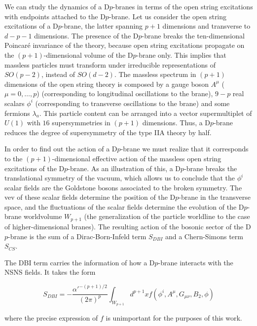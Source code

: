 We can study the dynamics of a D$p$-branes in terms of the open string excitations  with endpoints
attached to the D$p$-brane.
Let us consider the open string excitations of a D$p$-brane, the latter spanning $p+1$ dimensions and transverse to $d-p-1$ dimensions.
The presence of the D$p$-brane breaks the ten-dimensional Poincaré invariance of the theory, because
open string excitations propagate on the $(p+1)$-dimensional volume of the D$p$-brane only.
This implies that massless particles must transform under irreducible representations of $SO(p-2)$, instead of
$SO(d-2)$.
The massless spectrum in $(p+1)$ dimensions of the open string theory is composed by a gauge boson $A^\mu$ ($\mu=0,\ldots,p$) (corresponding
to longitudinal oscillations to the brane),
$9-p$ real scalars $\phi^i$ (corresponding to transverse oscillations to the brane) and some fermions $\lambda_a$.
This particle content can be arranged into a vector supermultiplet of $U(1)$ with $16$ supersymmetries
in $(p+1)$ dimensions. 
Thus, a D$p$-brane reduces the degree of supersymmetry of the type IIA theory by half.

In order to find out the action of a D$p$-brane we must realize that it corresponds to the
$(p+1)$-dimensional effective action of the massless open string excitations of the D$p$-brane.
As an illustration of this, a D$p$-brane breaks the translational symmetry of the vacuum, which allows
us to conclude that the $\phi^i$ scalar fields are the Goldstone bosons associated to the broken symmetry. 
The vev of these scalar fields determine the position of the D$p$-brane in the transverse space, and the fluctuations of the scalar
fields determine the evolution of the D$p$-brane worldvolume $W_{p+1}$ (the generalization of the particle worldline to the case of higher-dimensional branes). 
The resulting action of the bosonic sector of the D$p$-brane is the sum of a Dirac-Born-Infeld term $S_{DBI}$ and a Chern-Simons term $S_{CS}$.

The DBI term carries the information of how a D$p$-brane interacts with the NSNS fields. 
It takes the form

\begin{equation}
  S_{DBI}= -\frac{\alpha'^{-(p+1)/2}}{(2\pi)^p}\int_{W_{p+1}}  d^{p+1}x f(\phi^i, A^\mu, G_{\mu\nu}, B_2, \phi)
\end{equation}

where the precise expression of $f$ is unimportant for the purposes of this work.

